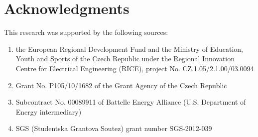 \section*{Acknowledgments}
This research was supported by the following sources:
\begin{enumerate}
	\item the European Regional Development Fund and the Ministry of
	Education, Youth and Sports of the Czech Republic under the Regional Innovation Centre for Electrical
	Engineering (RICE), project No. CZ.1.05/2.1.00/03.0094
	\item Grant No. P105/10/1682 of the Grant Agency of the Czech Republic
	\item Subcontract No. 00089911 of Battelle Energy Alliance (U.S. Department of Energy intermediary)
	\item SGS (Studentska Grantova Soutez) grant number SGS-2012-039
\end{enumerate}

